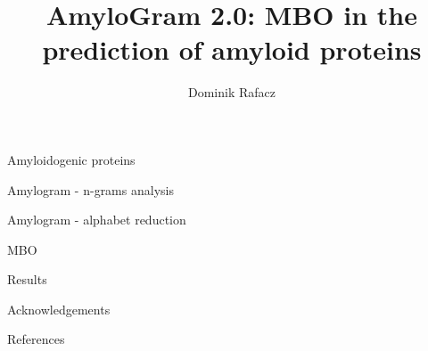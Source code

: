 \documentclass{beamer}
\title{AmyloGram 2.0: MBO in the prediction of amyloid proteins}
\date{}
\author{Dominik Rafacz}
\institute{Politechnika Warszawska, Faculty of Mathematics and Computer Science}
\begin{document}



\maketitle

\begin{frame}{Amyloidogenic proteins}

\end{frame} 


\begin{frame}{Amylogram - n-grams analysis}

\end{frame} 


\begin{frame}{Amylogram - alphabet reduction}

\end{frame} 


\begin{frame}{MBO}

\end{frame} 

\begin{frame}{Results}

\end{frame} 

\begin{frame}{Acknowledgements}

\end{frame} 

\begin{frame}{References}

\end{frame} 
\end{document}

